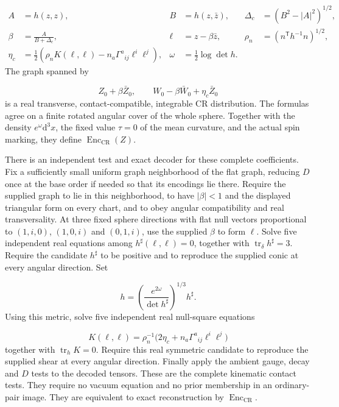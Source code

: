 \documentclass[
  english,
  11pt,
  reqno]{amsart}
\begin{document}
\label{eq:online-source-complete-contact-coefficients} \[
\begin{aligned}
A&=h(z,z),& B&=h(z,\bar z),&
\Delta_c&=(B^2-|A|^2)^{1/2},\\
\beta&=\frac{A}{B+\Delta_c},&
\ell&=z-\beta\bar z,&
\rho_n&=(n^{\mathsf T}h^{-1}n)^{1/2},\\
\eta_c&=\frac12\left(\rho_nK(\ell,\ell)
-n_a\Gamma^a{}_{ij}\ell^i\ell^j\right),
&\omega&=\frac12\log\det h.
\end{aligned}
\] The graph spanned by

\label{eq:online-source-contact-graph} \[
Z_0+\beta\bar Z_0,\qquad
W_0-\beta\bar W_0+\eta_c\bar Z_0
\] is a real transverse, contact-compatible, integrable CR distribution.
The formulas agree on a finite rotated angular cover of the whole
sphere. Together with the density \(e^\omega\mathrm d^3x\), the fixed
value \(\tau=0\) of the mean curvature, and the actual spin marking,
they define \(\operatorname{Enc}_{\mathrm{CR}}(Z)\).

There is an independent test and exact decoder for these complete
coefficients. Fix a sufficiently small uniform graph neighborhood of the
flat graph, reducing \(D\) once at the base order if needed so that its
encodings lie there. Require the supplied graph to lie in this
neighborhood, to have \(|\beta|<1\) and the displayed triangular form on
every chart, and to obey angular compatibility and real transversality.
At three fixed sphere directions with flat null vectors proportional to
\((1,i,0)\), \((1,0,i)\) and \((0,1,i)\), use the supplied \(\beta\) to
form \(\ell\). Solve five independent real equations among
\(h^\sharp(\ell,\ell)=0\), together with
\(\operatorname{tr}_\delta h^\sharp=3\). Require the candidate
\(h^\sharp\) to be positive and to reproduce the supplied conic at every
angular direction. Set

\label{eq:online-source-contact-density-scale} \[
h=\left(\frac{e^{2\omega}}{\det h^\sharp}\right)^{1/3}h^\sharp.
\] Using this metric, solve five independent real null-square equations

\label{eq:online-source-contact-shear-decoder} \[
K(\ell,\ell)
=\rho_n^{-1}\bigl(2\eta_c+n_a\Gamma^a{}_{ij}\ell^i\ell^j\bigr)
\] together with \(\operatorname{tr}_hK=0\). Require this real symmetric
candidate to reproduce the supplied shear at every angular direction.
Finally apply the ambient gauge, decay and \(D\) tests to the decoded
tensors. These are the complete kinematic contact tests. They require no
vacuum equation and no prior membership in an ordinary-pair image. They
are equivalent to exact reconstruction by
\(\operatorname{Enc}_{\mathrm{CR}}\).
\end{document}
